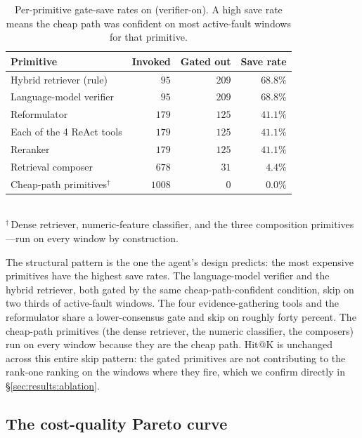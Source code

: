 \begin{table}[ht]
  \centering
  \caption{Per-primitive gate-save rates on \dsob{} (verifier-on). A high save rate means the cheap path was confident on most active-fault windows for that primitive.}
  \label{tab:per-skill-savings}
  \footnotesize
  \setlength{\tabcolsep}{4pt}
  \begin{tabular}{@{}l rrr@{}}
    \toprule
    Primitive & Invoked & Gated out & Save rate \\
    \midrule
    Hybrid retriever (rule)   & $95$   & $209$ & $68.8\%$ \\
    Language-model verifier   & $95$   & $209$ & $68.8\%$ \\
    Reformulator              & $179$  & $125$ & $41.1\%$ \\
    Each of the 4 ReAct tools & $179$  & $125$ & $41.1\%$ \\
    Reranker                  & $179$  & $125$ & $41.1\%$ \\
    Retrieval composer        & $678$  & $31$  & $4.4\%$  \\
    Cheap-path primitives$^\dagger$ & $1008$ & $0$   & $0.0\%$  \\
    \bottomrule
  \end{tabular}
  \\[2pt]
  {\scriptsize $^\dagger$\,Dense retriever, numeric-feature classifier, and the three composition primitives---run on every window by construction.}
\end{table}

The structural pattern is the one the agent's design predicts: the most expensive primitives have the highest save rates. The language-model verifier and the hybrid retriever, both gated by the same cheap-path-confident condition, skip on two thirds of active-fault windows. The four evidence-gathering tools and the reformulator share a lower-consensus gate and skip on roughly forty percent. The cheap-path primitives (the dense retriever, the numeric classifier, the composers) run on every window because they are the cheap path. Hit@K is unchanged across this entire skip pattern: the gated primitives are not contributing to the rank-one ranking on the windows where they fire, which we confirm directly in \S\ref{sec:results:ablation}.

\subsection{The cost-quality Pareto curve}
\label{sec:results:pareto}

